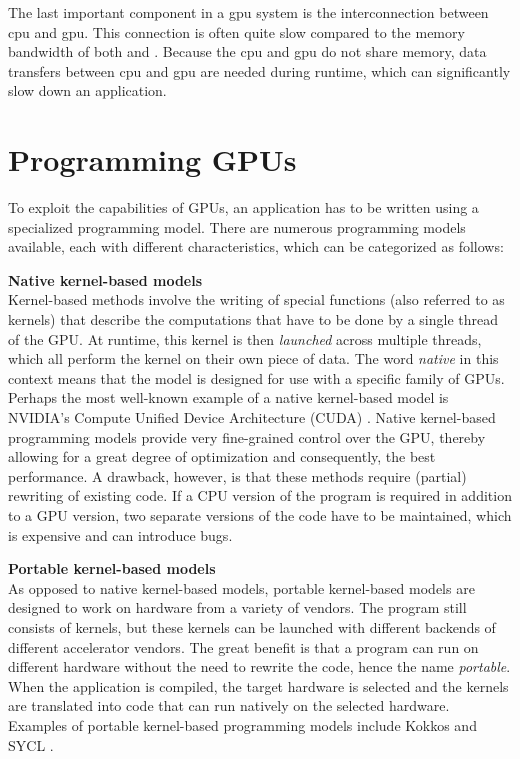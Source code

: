 The last important component in a \acrshort{gpu} system is the interconnection between \acrshort{cpu} and \acrshort{gpu}. This connection is often quite slow compared to the memory bandwidth of both  and . Because the \acrshort{cpu} and \acrshort{gpu} do not share memory, data transfers between \acrshort{cpu} and \acrshort{gpu} are needed during runtime, which can significantly slow down an application.

\newpage
\section{Programming GPUs} \label{sec:programming_gpus}
To exploit the capabilities of GPUs, an application has to be written using a specialized programming model. There are numerous programming models available, each with different characteristics, which can be categorized as follows:

\textbf{Native kernel-based models} \\
Kernel-based methods involve the writing of special functions (also referred to as kernels) that describe the computations that have to be done by a single thread of the GPU.  At runtime, this kernel is then \emph{launched} across multiple threads, which all perform the kernel on their own piece of data. The word \emph{native} in this context means that the model is designed for use with a specific family of GPUs. Perhaps the most well-known example of a native kernel-based model is NVIDIA's Compute Unified Device Architecture (CUDA) \citep{dallyEvolutionGraphicsProcessing2021}. Native kernel-based programming models provide very fine-grained control over the GPU, thereby allowing for a great degree of optimization and consequently, the best performance. A drawback, however, is that these methods require (partial) rewriting of existing code. If a CPU version of the program is required in addition to a GPU version, two separate versions of the code have to be maintained, which is expensive and can introduce bugs.

\textbf{Portable kernel-based models} \\
As opposed to native kernel-based models, portable kernel-based models are designed to work on hardware from a variety of vendors. The program still consists of kernels, but these kernels can be launched with different backends of different accelerator vendors. The great benefit is that a program can run on different hardware without the need to rewrite the code, hence the name \emph{portable}. When the application is compiled, the target hardware is selected and the kernels are translated into code that can run natively on the selected hardware. Examples of portable kernel-based programming models include Kokkos \citep{trottKokkosProgrammingModel2022} and SYCL \citep{khronosgroupSYCL2020Specification2023}.


